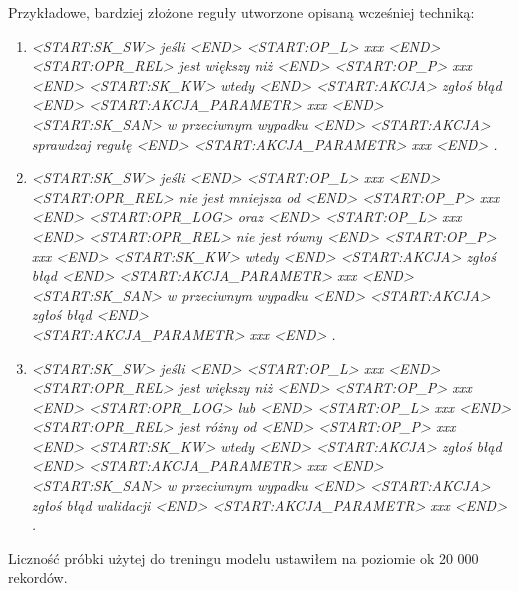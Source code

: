 Przykładowe, bardziej złożone reguły utworzone opisaną wcześniej techniką:

\begin{enumerate}
	\item \small\textit{ <START:SK\_SW> jeśli <END> <START:OP\_L> xxx <END> <START:OPR\_REL> jest większy niż <END> <START:OP\_P> xxx <END> <START:SK\_KW> wtedy <END> <START:AKCJA> zgłoś błąd <END> <START:AKCJA\_PARAMETR> xxx <END>  <START:SK\_SAN> w przeciwnym wypadku <END> <START:AKCJA> sprawdzaj regułę <END> <START:AKCJA\_PARAMETR> xxx <END> .}
	\item \small\textit{ <START:SK\_SW> jeśli <END> <START:OP\_L> xxx <END> <START:OPR\_REL> nie jest mniejsza od <END> <START:OP\_P> xxx <END> <START:OPR\_LOG> oraz <END> <START:OP\_L> xxx <END> <START:OPR\_REL> nie jest równy <END> <START:OP\_P> xxx <END> <START:SK\_KW> wtedy <END> <START:AKCJA> zgłoś błąd <END> <START:AKCJA\_PARAMETR> xxx <END>  <START:SK\_SAN> w przeciwnym wypadku <END> <START:AKCJA> zgłoś błąd <END> \\ <START:AKCJA\_PARAMETR> xxx <END> .}
	
	\item \small \textit{<START:SK\_SW> jeśli <END> <START:OP\_L> xxx <END> <START:OPR\_REL> jest większy niż <END> <START:OP\_P> xxx <END> <START:OPR\_LOG> lub <END> <START:OP\_L> xxx <END> <START:OPR\_REL> jest różny od <END> <START:OP\_P> xxx <END> <START:SK\_KW> wtedy <END> <START:AKCJA> zgłoś błąd <END> <START:AKCJA\_PARAMETR> xxx <END>  <START:SK\_SAN> w przeciwnym wypadku <END> <START:AKCJA> zgłoś błąd walidacji <END> <START:AKCJA\_PARAMETR> xxx <END> .}
\end{enumerate}

Liczność próbki użytej do treningu modelu ustawiłem na poziomie ok 20 000 rekordów.